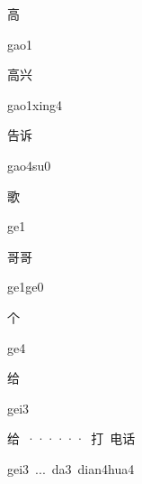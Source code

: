 \begin{verbete}[gao1]{高}
\begin{pronuncia}{gao1}
\end{pronuncia}
\end{verbete}

\begin{verbete}{高兴}
\begin{pronuncia}{gao1xing4}
\end{pronuncia}
\end{verbete}

\begin{verbete}[gao4su0]{告诉}
\begin{pronuncia}{gao4su0}
\end{pronuncia}
\end{verbete}

\begin{verbete}[ge1]{歌}
\begin{pronuncia}{ge1}
\end{pronuncia}
\end{verbete}

\begin{verbete}[ge1ge0]{哥哥}
\begin{pronuncia}{ge1ge0}
\end{pronuncia}
\end{verbete}

\begin{verbete}[ge4]{个}
\begin{pronuncia}{ge4}
\end{pronuncia}
\end{verbete}

\begin{verbete}[gei3]{给}
\begin{pronuncia}{gei3}
\end{pronuncia}
\end{verbete}

\begin{verbete}{给\ ······\ 打\ 电话}
\begin{pronuncia}[\\]{gei3\ ...\ da3\ dian4hua4}
\end{pronuncia}
\end{verbete}

